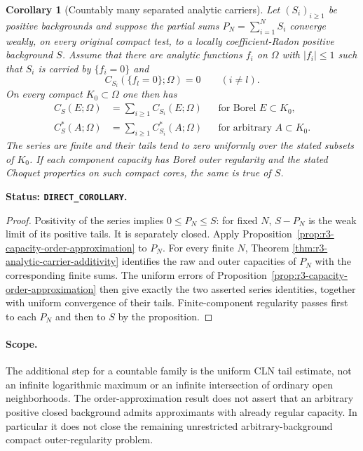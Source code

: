 \documentclass[11pt,a4paper]{article}
\numberwithin{equation}{section}
\newtheorem{corollary}[theorem]{Corollary}
\theoremstyle{definition}
\theoremstyle{remark}
\begin{document}
\begin{corollary}[Countably many separated analytic carriers]
\label{cor:r3-countable-carrier-capacity}
Let $(S_i)_{i\geq1}$ be positive backgrounds and suppose the partial
sums $P_N=\sum_{i=1}^N S_i$ converge weakly, on every original
compact test, to a locally coefficient-Radon positive background
$S$.  Assume that there are analytic functions $f_i$ on $\Omega$
with $|f_i|\leq1$ such that $S_i$ is carried by $\{f_i=0\}$ and
\[
 C_{S_i}(\{f_l=0\};\Omega)=0\qquad(i\ne l).
\]
On every compact $K_0\subset\Omega$ one then has
\begin{align*}
 C_S(E;\Omega)&=\sum_{i\geq1}C_{S_i}(E;\Omega)
       &&\text{for Borel }E\subset K_0,\\
 C_S^*(A;\Omega)&=\sum_{i\geq1}C_{S_i}^*(A;\Omega)
       &&\text{for arbitrary }A\subset K_0.
\end{align*}
The series are finite and their tails tend to zero uniformly over
the stated subsets of $K_0$.  If each component capacity has Borel
outer regularity and the stated Choquet properties on such compact
cores, the same is true of $S$.
\end{corollary}

\noindent\textbf{Status: \texttt{DIRECT\_COROLLARY}.}

\begin{proof}
Positivity of the series implies $0\leq P_N\leq S$: for fixed $N$,
$S-P_N$ is the weak limit of its positive tails.  It is separately
closed.  Apply Proposition~\ref{prop:r3-capacity-order-approximation}
to $P_N$.  For every finite $N$, Theorem
\ref{thm:r3-analytic-carrier-additivity} identifies the raw and outer
capacities of $P_N$ with the corresponding finite sums.  The uniform
errors of Proposition~\ref{prop:r3-capacity-order-approximation}
then give exactly the two asserted series identities, together with
uniform convergence of their tails.  Finite-component regularity
passes first to each $P_N$ and then to $S$ by the proposition.
\end{proof}

\paragraph{Scope.}
The additional step for a countable family is the uniform CLN tail
estimate, not an infinite logarithmic maximum or an infinite
intersection of ordinary open neighborhoods.  The order-approximation
result does not assert that an arbitrary positive closed background
admits approximants with already regular capacity.  In particular
it does not close the remaining unrestricted arbitrary-background
compact outer-regularity problem.
\end{document}
